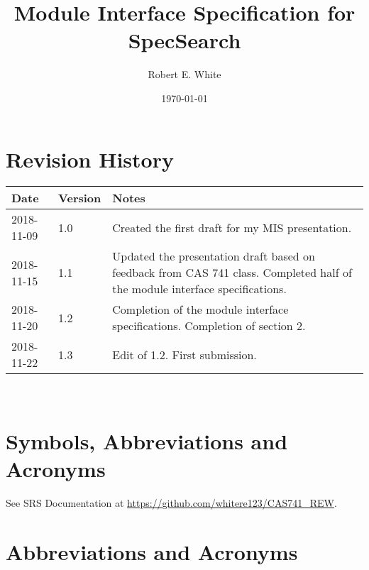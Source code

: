 \documentclass[12pt, titlepage]{article}
\newcommand{\progname}{SpecSearch}
\begin{document}
\title{Module Interface Specification for \progname}

\author{Robert E. White}

\date{\today}

\maketitle


\section{Revision History}

\begin{tabularx}{\textwidth}{p{3cm}p{2cm}X}
\toprule {\bf Date} & {\bf Version} & {\bf Notes}\\
\midrule
2018-11-09 & 1.0 & Created the first draft for my MIS presentation. \\ 
2018-11-15 & 1.1 & Updated the presentation draft based on feedback from CAS 
741 class. 
Completed half of the module interface specifications. \\ 
2018-11-20 & 1.2 & Completion of the module interface specifications. 
Completion of section 2. \\
2018-11-22 & 1.3 & Edit of 1.2. First submission. \\
\bottomrule
\end{tabularx}

~\newpage

\section{Symbols, Abbreviations and Acronyms} \label{abbrev}

See SRS Documentation at \url{https://github.com/whitere123/CAS741_REW}. 

\section*{Abbreviations and Acronyms}
\end{document}
